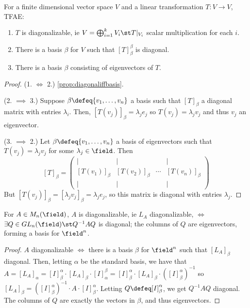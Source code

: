 \begin{proposition}
    For a finite dimensional vector space $V$ and a linear transformation $T : V \to V$, TFAE:
    \begin{enumerate}
        \item $T$ is diagonalizable, ie $V = \bigoplus_{i=1}^k V_i \st T\vert_{V_i}$ scalar multiplication for each $i$.
        \item There is a basis $\beta$ for $V$ such that $[T]_\beta^\beta$ is diagonal.
        \item There is a basis $\beta$ consisting of eigenvectors of $T$.
    \end{enumerate}    
\end{proposition}

\begin{proof}
    (1. $\iff$ 2.) \cref{prop:diagonaliffbasis}.


    (2. $\implies$ 3.) Suppose $\beta \defeq\{v_1, \dots, v_n\}$ a basis such that $[T]_\beta$ a diagonal matrix with entries $\lambda_i$. Then, $[T(v_j)]_\beta = \lambda_j e_j$ so $T(v_j) = \lambda_j v_j$ and thus $v_j$ an eigenvector.

    (3. $\implies$ 2.) Let $\beta \defeq\{v_1, \dots, v_n\}$ a basis of eigenvectors such that $T(v_j) = \lambda_j v_j$ for some $\lambda_j \in \field$. Then \[
    [T]_\beta = \begin{pmatrix}
        \vert & \vert & & \vert\\
        [T(v_1)]_\beta & [T(v_2)]_\beta & \cdots & [T(v_n)]_\beta \\
        \vert & \vert & & \vert
    \end{pmatrix}
    \]
    But $[T(v_j)]_\beta = [\lambda_j v_j]_\beta = \lambda_j e_j$, so this matrix is diagonal with entries $\lambda_{j}$.
\end{proof}

\begin{proposition}
    For $A \in M_n(\field)$, $A$ is diagonalizable, ie $L_A$ diagonalizable, $\iff$ $\exists Q \in GL_n(\field) \st Q^{-1}A Q$ is diagonal; the columns of $Q$ are eigenvectors, forming a basis for $\field^n$.
\end{proposition}

\begin{proof}
    $A$ diagonalizable $\iff$ there is a basis $\beta$ for $\field^n$ such that $[L_A]_\beta$ diagonal. Then, letting $\alpha$ be the standard basis, we have that $A = [L_A]_\alpha = [I]_\beta^\alpha \cdot [L_A]_\beta \cdot [I]_\alpha^\beta = [I]_\beta^\alpha \cdot [L_A]_\beta \cdot ([I]_\beta^\alpha)^{-1}$ so $[L_A]_\beta = ([I]_\beta^\alpha)^{-1} \cdot A \cdot [I]_\beta^\alpha$. Letting $Q \defeq [I]_\beta^\alpha$, we get $Q^{-1}A Q$ diagonal. The columns of $Q$ are exactly the vectors in $\beta$, and thus eigenvectors.
\end{proof}

